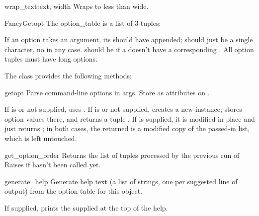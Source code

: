 \documentclass{manual}
\begin{document}
\begin{funcdesc}{wrap_text}{text, width}
Wraps  to less than  wide.

\end{funcdesc}

\begin{classdesc}{FancyGetopt}{}
The option_table is a list of 3-tuples: 

If an option takes an argument, its  should have 
appended;  should just be a single character, no 
in any case.  should be  if a  
doesn't have a corresponding . All option tuples must have
long options.
\end{classdesc}

The  class provides the following methods:

\begin{methoddesc}{getopt}{}
Parse command-line options in args. Store as attributes on .

If  is  or not supplied, uses .  If
 is  or not supplied, creates a new 
instance, stores option values there, and returns a tuple .  If  is supplied, it is modified in place and
 just returns ; in both cases, the returned
 is a modified copy of the passed-in  list, which
is left untouched.
\end{methoddesc}

\begin{methoddesc}{get_option_order}{}
Returns the list of  tuples processed by the
previous run of   Raises  if
 hasn't been called yet.
\end{methoddesc}

\begin{methoddesc}{generate_help}{}
Generate help text (a list of strings, one per suggested line of
output) from the option table for this  object.

If supplied, prints the supplied  at the top of the help.
\end{methoddesc}
\end{document}
